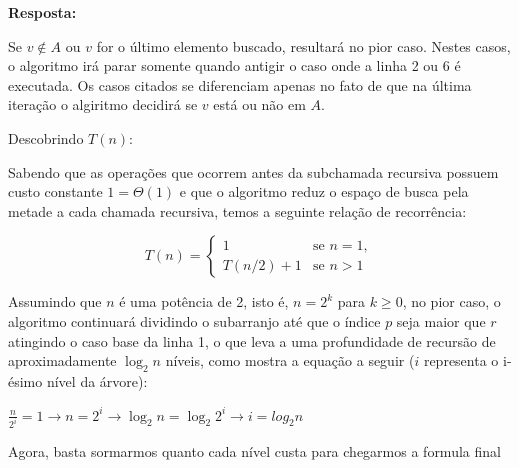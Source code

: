 \documentclass{article}
\begin{document}
    \textbf{Resposta:}

    \begin{algorithm}[H]
        \caption{Pesquisa\_binaria}
        \label{pesquisa-binaria}

    \end{algorithm}

    Se $v \notin A$ ou $v$ for o último elemento buscado, resultará no pior caso. Nestes casos, o algoritmo irá parar somente quando antigir o caso onde a linha 2 ou 6 é executada. Os casos citados se diferenciam apenas no fato de que na última iteração o algiritmo decidirá se $v$ está ou não em $A$. 

    Descobrindo $T(n)$:
    
    Sabendo que as operações que ocorrem antes da subchamada recursiva possuem custo constante $1 = \Theta(1)$ e que o algoritmo reduz o espaço de busca pela metade a cada chamada recursiva, temos a seguinte relação de recorrência:

    \[
    T(n) =
    \begin{cases}
        1 & \text{se } n = 1, \\
        T(n/2) + 1 & \text{se } n > 1 
    \end{cases}
    \]

    Assumindo que $n$ é uma potência de 2, isto é, $n = 2^k$ para $k \geq 0$, no pior caso, o algoritmo continuará dividindo o subarranjo até que o índice $p$ seja maior que $r$ atingindo o caso base da linha 1, o que leva a uma profundidade de recursão de aproximadamente $\log_2 n$ níveis, como mostra a equação a seguir ($i$ representa o i-ésimo nível da árvore):

    $\frac{n}{2^i} = 1 \rightarrow n = 2^i \rightarrow \log_2 n = \log_2 2^i \rightarrow i = log_2 n$

    Agora, basta sormarmos quanto cada nível custa para chegarmos a formula final
\end{document}

